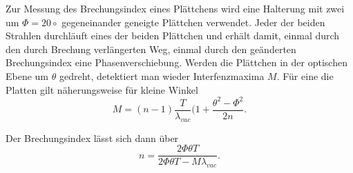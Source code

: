 Zur Messung des Brechungsindex eines Plättchens wird eine Halterung mit zwei um $\Phi = 20\circ$ gegeneinander geneigte Plättchen verwendet. Jeder der beiden Strahlen durchläuft eines der beiden Plättchen und erhält damit, einmal durch den durch Brechung verlängerten Weg, einmal durch den geänderten Brechungsindex eine Phasenverschiebung. Werden die Plättchen in der optischen Ebene um $\theta$ gedreht, detektiert man wieder Interfenzmaxima $M$.
Für eine die Platten gilt näherungsweise für kleine Winkel
\begin{equation}
	M = (n-1)\frac{T}{\lambda_{vac}}(1+\frac{\theta^2-\Phi^2}{2n}.
  \label{eq:index}
\end{equation}

Der Brechungsindex lässt sich dann über
\begin{equation}
	n = \frac{2\Phi \theta T}{2\Phi \theta T-M \lambda_{vac}}.
\end{equation}


